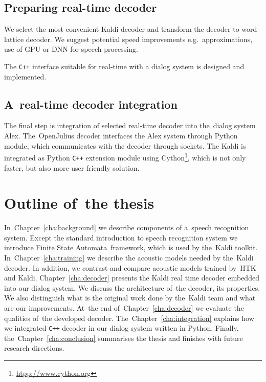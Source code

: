 \subsection{Preparing real-time decoder} 
\label{sub:compare_rt}

We select the most convenient Kaldi decoder and 
transform the decoder to word lattice decoder. 
We suggest potential speed improvements e.g.\ approximations, use of \ac{GPU} 
or \ac{DNN} for speech processing\cite{vesely2013sequencediscriminative}.

The \verb!C++! interface suitable for real-time with a dialog system is designed and implemented.

\subsection{A~real-time decoder integration} 
\label{sub:integration}
The final step is integration of selected real-time decoder into the~dialog system Alex.
The~OpenJulius decoder interfaces the Alex system through Python module, 
which communicates with the decoder through sockets.
The Kaldi is integrated as Python \verb!C++! extension module 
using Cython\footnote{\url{htpp://www.cython.org}}, 
which is not only faster, but also more user friendly solution.


\section{Outline of~the thesis} 
\label{sec:outline_of_the_thesis}
In~Chapter~\ref{cha:background} we describe components of a~speech recognition system.  
Except the standard introduction to speech recognition system we introduce Finite State Automata~framework,
which is used by the~Kaldi toolkit. In~Chapter~\ref{cha:training} we describe the acoustic 
models needed by the~Kaldi decoder. 
In addition, we contrast and compare acoustic models trained by~\ac{HTK} and Kaldi. 
Chapter~\ref{cha:decoder} presents the Kaldi real time decoder embedded into our dialog system.
We discuss the architecture of~the decoder, its properties. We also distinguish what is the original work done by 
the~Kaldi team and what are our improvements. At~the end of~Chapter~\ref{cha:decoder} 
we evaluate the qualities of~the developed decoder.
The~Chapter~\ref{cha:integration} explains how we integrated \verb!C++! decoder in our dialog system written in Python.
Finally, the~Chapter~\ref{cha:conclusion} summarises the thesis and finishes with future research directions.

